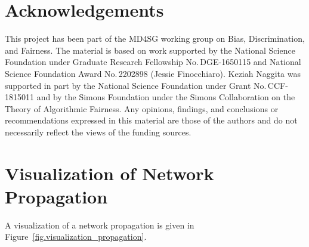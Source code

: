 \documentclass[letterpaper]{article} %
\begin{document}
\section*{Acknowledgements}
This project has been part of the MD4SG working
group on Bias, Discrimination, and Fairness.
%
The material is based on work supported by the National Science Foundation under Graduate Research Fellowship No.\,DGE-1650115 and National Science Foundation Award No.\,2202898 (Jessie Finocchiaro).
%
Keziah Naggita was supported in part by the National Science Foundation under Grant No.\,CCF-1815011 and by the Simons Foundation under the Simons Collaboration on the Theory of Algorithmic Fairness.
%
Any opinions, findings, and conclusions or recommendations expressed in this material are those of the authors and do not necessarily reflect the views of the funding sources.





\onecolumn
\newpage
\appendix

\section{Visualization of Network Propagation}\label{sec:visualization_network}

A visualization of a network propagation is given in Figure~\ref{fig.visualization_propagation}.
\end{document}
